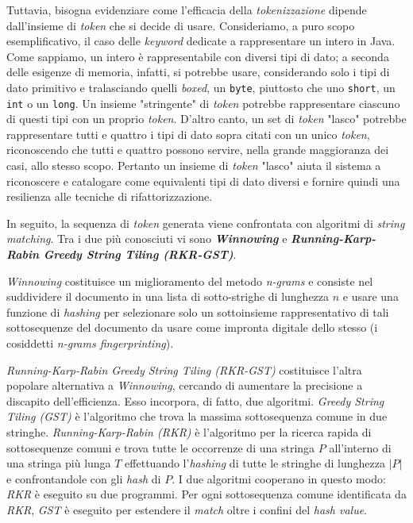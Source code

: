 Tuttavia, bisogna evidenziare come l'efficacia della \textit{tokenizzazione} dipende dall'insieme di \textit{token} che si decide di usare.
%
Consideriamo, a puro scopo esemplificativo, il caso delle \textit{keyword} dedicate a rappresentare un intero in Java.
%
Come sappiamo, un intero è rappresentabile con diversi tipi di dato; a seconda delle esigenze di memoria, infatti, si potrebbe usare, considerando solo i tipi di dato primitivo e tralasciando quelli \textit{boxed}, un \texttt{byte}, piuttosto che uno \texttt{short}, un \texttt{int} o un \texttt{long}. 
%
Un insieme "stringente" di \textit{token} potrebbe rappresentare ciascuno di questi tipi con un proprio \textit{token}.
%
D'altro canto, un set di \textit{token} "lasco" potrebbe rappresentare tutti e quattro i tipi di dato sopra citati con un unico \textit{token}, riconoscendo che tutti e quattro possono servire, nella grande maggioranza dei casi, allo stesso scopo.
%
Pertanto un insieme di \textit{token} "lasco" aiuta il sistema a riconoscere e catalogare come equivalenti tipi di dato diversi e fornire quindi una resilienza alle tecniche di rifattorizzazione.

In seguito, la sequenza di \textit{token} generata viene confrontata con algoritmi di \textit{string matching}. 
%
Tra i due più conosciuti vi sono \textbf{\textit{Winnowing}} e \textbf{\textit{Running-Karp-Rabin Greedy String Tiling (RKR-GST)}}.

\textit{Winnowing} costituisce un miglioramento del metodo \textit{n-grams} e consiste nel suddividere il documento in una lista di sotto-strighe di lunghezza $n$ e  usare una funzione di \textit{hashing} per selezionare solo un sottoinsieme rappresentativo di tali sottosequenze del documento da usare come impronta digitale dello stesso (i cosiddetti \textit{n-grams fingerprinting}).

\textit{Running-Karp-Rabin Greedy String Tiling (RKR-GST)} costituisce l'altra popolare alternativa a \textit{Winnowing}, cercando di aumentare la precisione a discapito dell'efficienza. 
%
Esso incorpora, di fatto, due algoritmi.
%
\textit{Greedy String Tiling (GST)} è l'algoritmo che trova la massima sottosequenza comune in due stringhe.
%
\textit{Running-Karp-Rabin (RKR)} è l'algoritmo per la ricerca rapida di sottosequenze comuni e trova tutte le occorrenze di una stringa $P$ all'interno di una stringa più lunga $T$ effettuando l'\textit{hashing} di tutte le stringhe di lunghezza $|P|$ e confrontandole con gli \textit{hash} di $P$.
%
I due algoritmi cooperano in questo modo: \textit{RKR} è eseguito su due programmi.
%
Per ogni sottosequenza comune identificata da \textit{RKR}, \textit{GST} è eseguito per estendere il \textit{match} oltre i confini del \textit{hash value}.

